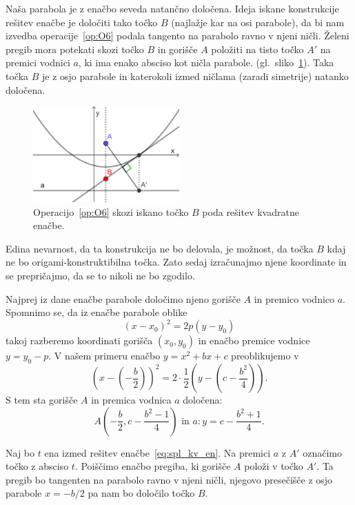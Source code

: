 Naša parabola je z enačbo seveda natančno določena. Ideja iskane konstrukcije rešitev enačbe je določiti tako točko $B$ (najlažje kar na osi parabole), da bi nam izvedba operacije~\ref{op:O6} podala tangento na parabolo ravno v njeni ničli. Želeni pregib mora potekati skozi točko $B$ in gorišče $A$ položiti na tisto točko $A'$ na premici vodnici $a$, ki ima enako absciso kot ničla parabole. (gl.\ sliko~\ref{fig:tockaB_in_O6}). Taka točka $B$ je z osjo parabole in katerokoli izmed ničlama (zaradi simetrije) natanko določena.

\begin{figure}[h]
    \centering
    \includegraphics[width=0.5\textwidth]{images/kvadratna_enacba/tockaB_in_O6.png}
    \caption[Iskanje točke $B$]{Operacijo~\ref{op:O6} skozi iskano točko $B$ poda rešitev kvadratne enačbe.}
    \label{fig:tockaB_in_O6}
\end{figure}

Edina nevarnost, da ta konstrukcija ne bo delovala, je možnost, da točka $B$ kdaj ne bo origami-konstruktibilna točka. Zato sedaj izračunajmo njene koordinate in se prepričajmo, da se to nikoli ne bo zgodilo.

Najprej iz dane enačbe parabole določimo njeno gorišče $A$ in premico vodnico $a$. Spomnimo se, da iz enačbe parabole oblike
$$ (x - x_0)^2 = 2p(y - y_0) $$
takoj razberemo koordinati gorišča $(x_0, y_0)$ in enačbo premice vodnice $y = y_0 - p$. V našem primeru enačbo $y = x^2 + bx + c$ preoblikujemo v
$$ \left(x-\left(-\frac{b}{2}\right)\right)^2 = 2 \cdot \frac{1}{2} \left(y - \left(c - \frac{b^2}{4}\right)\right). $$
S tem sta gorišče $A$ in premica vodnica $a$ določena:
$$ A\left(-\frac{b}{2}, c - \frac{b^2 - 1}{4}\right) \text{ in } a: y = c - \frac{b^2 + 1}{4}. $$

Naj bo $t$ ena izmed rešitev enačbe~\ref{eq:spl_kv_en}. Na premici $a$ z $A'$ označimo točko z absciso $t$. Poiščimo enačbo pregiba, ki gorišče $A$ položi v točko $A'$. Ta pregib bo tangenten na parabolo ravno v njeni ničli, njegovo presečišče z osjo parabole $ x = -b/2 $ pa nam bo določilo točko $B$.


